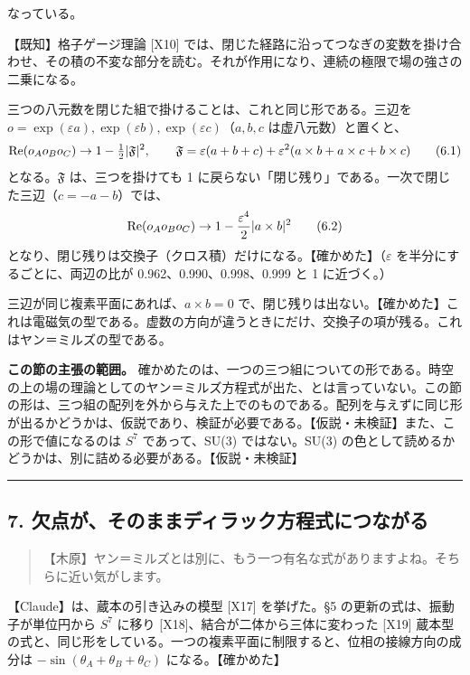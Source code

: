 \documentclass[
  a4paper,
]{ltjsarticle}
\begin{document}
なっている。

【既知】格子ゲージ理論 {[}X10{]}
では、閉じた経路に沿ってつなぎの変数を掛け合わせ、その積の不変な部分を読む。それが作用になり、連続の極限で場の強さの二乗になる。

三つの八元数を閉じた組で掛けることは、これと同じ形である。三辺を
\(o = \exp(\varepsilon a), \exp(\varepsilon b), \exp(\varepsilon c)\)（\(a, b, c\)
は虚八元数）と置くと、 \[
{\rm Re}(o_Ao_Bo_C) \to 1 - \tfrac12\lvert\mathfrak{F}\rvert^2,\qquad \mathfrak{F} = \varepsilon(a+b+c) + \varepsilon^2(a\times b + a\times c + b\times c) \tag{6.1}
\] となる。\(\mathfrak{F}\) は、三つを掛けても 1
に戻らない「閉じ残り」である。一次で閉じた三辺（\(c = -a-b\)）では、 \[
{\rm Re}(o_Ao_Bo_C) \to 1 - \frac{\varepsilon^4}{2}\lvert a\times b\rvert^2 \tag{6.2}
\]
となり、閉じ残りは交換子（クロス積）だけになる。【確かめた】（\(\varepsilon\)
を半分にするごとに、両辺の比が 0.962、0.990、0.998、0.999 と 1
に近づく。）

三辺が同じ複素平面にあれば、\(a\times b = 0\)
で、閉じ残りは出ない。【確かめた】これは電磁気の型である。虚数の方向が違うときにだけ、交換子の項が残る。これはヤン＝ミルズの型である。

\textbf{この節の主張の範囲。}
確かめたのは、一つの三つ組についての形である。時空の上の場の理論としてのヤン＝ミルズ方程式が出た、とは言っていない。この節の形は、三つ組の配列を外から与えた上でのものである。配列を与えずに同じ形が出るかどうかは、仮説であり、検証が必要である。【仮説・未検証】また、この形で値になるのは
\(S^7\) であって、SU(3) ではない。SU(3)
の色として読めるかどうかは、別に詰める必要がある。【仮説・未検証】

\begin{center}\rule{0.5\linewidth}{0.5pt}\end{center}

\subsection{7.
欠点が、そのままディラック方程式につながる}\label{ux6b20ux70b9ux304cux305dux306eux307eux307eux30c7ux30a3ux30e9ux30c3ux30afux65b9ux7a0bux5f0fux306bux3064ux306aux304cux308b}

\begin{quote}
【木原】ヤン＝ミルズとは別に、もう一つ有名な式がありますよね。そちらに近い気がします。
\end{quote}

【Claude】は、蔵本の引き込みの模型 {[}X17{]} を挙げた。§5
の更新の式は、振動子が単位円から \(S^7\) に移り
{[}X18{]}、結合が二体から三体に変わった {[}X19{]}
蔵本型の式と、同じ形をしている。一つの複素平面に制限すると、位相の接線方向の成分は
\(-\sin(\theta_A+\theta_B+\theta_C)\) になる。【確かめた】
\end{document}
